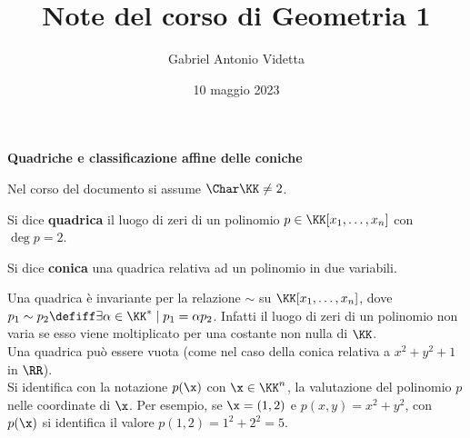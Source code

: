 \documentclass[11pt]{article}
\title{\textbf{Note del corso di Geometria 1}}
\author{Gabriel Antonio Videtta}
\date{10 maggio 2023}
\begin{document}
	
	\maketitle
	
	\begin{center}
		\Large \textbf{Quadriche e classificazione affine delle coniche}
	\end{center}
	
	\begin{note}
		Nel corso del documento si assume $\Char \KK \neq 2$.
	\end{note}
	
	\begin{definition}[quadriche] Si dice \textbf{quadrica} il luogo di zeri
		di un polinomio $p \in \KK[x_1, \ldots, x_n]$ con $\deg p = 2$.
	\end{definition}
	
	\begin{definition}[coniche] Si dice \textbf{conica} una quadrica relativa ad un polinomio
		in due variabili.
	\end{definition}
	
	\begin{remark}\nl
		\li Una quadrica è invariante per la relazione $\sim$ su $\KK[x_1, \ldots, x_n]$, dove
		$p_1 \sim p_2 \defiff \exists \alpha \in \KK^* \mid p_1 = \alpha p_2$. Infatti
		il luogo di zeri di un polinomio non varia se esso viene moltiplicato per una costante non nulla di $\KK$. \\
		\li Una quadrica può essere vuota (come nel caso della conica relativa a $x^2 + y^2 + 1$ in $\RR$). \\
		\li Si identifica con la notazione $p(\x)$ con $\x \in \KK^n$, la valutazione del polinomio $p$ nelle coordinate
		di $\x$. Per esempio, se $\x = (1, 2)$ e $p(x, y) = x^2 + y^2$, con $p(\x)$ si identifica il valore
		$p(1, 2) = 1^2 + 2^2 = 5$.
	\end{remark}
	
\end{document}
